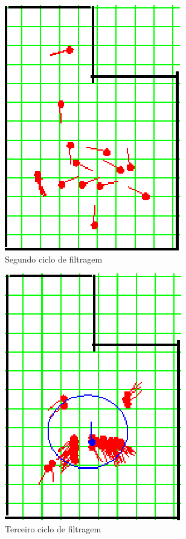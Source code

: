 \begin{figure}[H]
  \centering
  \includegraphics[scale=0.6]{figuras/cen2_ex4/3.eps}
  \caption[Segundo Ciclo de Filtragem]{Segundo ciclo de filtragem}
  \label{img:cen2_ex4_3}
\end{figure}

\begin{figure}[H]
  \centering
  \includegraphics[scale=0.6]{figuras/cen2_ex4/4.eps}
  \caption[Terceiro Ciclo de Filtragem]{Terceiro ciclo de filtragem}
  \label{img:cen2_ex4_4}
\end{figure}

